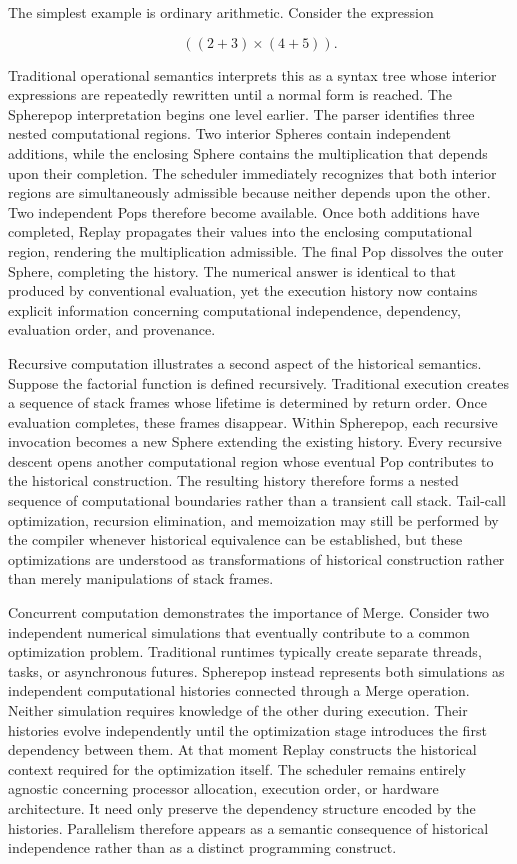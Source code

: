 \documentclass[12pt,oneside]{article}
\theoremstyle{definition}
\theoremstyle{remark}
\begin{document}
The simplest example is ordinary arithmetic. Consider the expression

\[
((2+3)\times(4+5)).
\]

Traditional operational semantics interprets this as a syntax tree whose
interior expressions are repeatedly rewritten until a normal form is reached.
The Spherepop interpretation begins one level earlier. The parser identifies
three nested computational regions. Two interior Spheres contain independent
additions, while the enclosing Sphere contains the multiplication that depends
upon their completion. The scheduler immediately recognizes that both interior
regions are simultaneously admissible because neither depends upon the other.
Two independent Pops therefore become available. Once both additions have
completed, Replay propagates their values into the enclosing computational
region, rendering the multiplication admissible. The final Pop dissolves the
outer Sphere, completing the history. The numerical answer is identical to
that produced by conventional evaluation, yet the execution history now
contains explicit information concerning computational independence,
dependency, evaluation order, and provenance.

Recursive computation illustrates a second aspect of the historical semantics.
Suppose the factorial function is defined recursively. Traditional execution
creates a sequence of stack frames whose lifetime is determined by return
order. Once evaluation completes, these frames disappear. Within Spherepop,
each recursive invocation becomes a new Sphere extending the existing history.
Every recursive descent opens another computational region whose eventual Pop
contributes to the historical construction. The resulting history therefore
forms a nested sequence of computational boundaries rather than a transient
call stack. Tail-call optimization, recursion elimination, and memoization may
still be performed by the compiler whenever historical equivalence can be
established, but these optimizations are understood as transformations of
historical construction rather than merely manipulations of stack frames.

Concurrent computation demonstrates the importance of Merge. Consider two
independent numerical simulations that eventually contribute to a common
optimization problem. Traditional runtimes typically create separate threads,
tasks, or asynchronous futures. Spherepop instead represents both simulations
as independent computational histories connected through a Merge operation.
Neither simulation requires knowledge of the other during execution. Their
histories evolve independently until the optimization stage introduces the
first dependency between them. At that moment Replay constructs the historical
context required for the optimization itself. The scheduler remains entirely
agnostic concerning processor allocation, execution order, or hardware
architecture. It need only preserve the dependency structure encoded by the
histories. Parallelism therefore appears as a semantic consequence of
historical independence rather than as a distinct programming construct.
\end{document}
